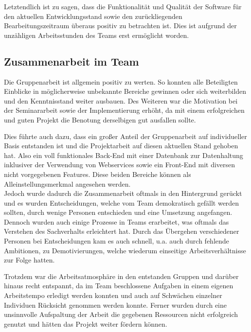 Letztendlich ist zu sagen, dass die Funktionalität und Qualität der Software für den aktuellen Entwicklungsstand sowie den zurückliegenden Bearbeitungszeitraum überaus positiv zu betrachten ist.
Dies ist aufgrund der unzähligen Arbeitsstunden des Teams erst ermöglicht worden.

\subsection{Zusammenarbeit im Team}
\multipleauthorsection{\authorRF}{\authorEJ}

Die Gruppenarbeit ist allgemein positiv zu werten. 
So konnten alle Beteiligten Einblicke in möglicherweise unbekannte Bereiche gewinnen oder sich weiterbilden und den Kenntnisstand weiter ausbauen.
Des Weiteren war die Motivation bei der Seminararbeit sowie der Implementierung erhöht, da mit einem erfolgreichen und guten Projekt die Benotung derselbigen gut ausfallen sollte.

Dies führte auch dazu, dass ein großer Anteil der Gruppenarbeit auf individueller Basis entstanden ist und die Projektarbeit auf diesen aktuellen Stand gehoben hat. Also ein voll funktionales Back-End mit einer Datenbank zur Datenhaltung inklusiver der Verwendung von Webservices sowie ein Front-End mit diversen nicht vorgegebenen Features. Diese beiden Bereiche können als Alleinstellungsmerkmal angesehen werden.\\
Jedoch wurde dadurch die Zusammenarbeit oftmals in den Hintergrund gerückt und es wurden Entscheidungen, welche vom Team demokratisch gefällt werden sollten, durch wenige Personen entschieden und eine Umsetzung angefangen. Dennoch wurden auch einige Prozesse in Teams erarbeitet, was oftmals das Verstehen des Sachverhalts erleichtert hat.
Durch das Übergehen verschiedener Personen bei Entscheidungen kam es auch schnell, u.a. auch durch fehlende Ambitionen, zu Demotivierungen, welche wiederum einseitige Arbeitsverhältnisse zur Folge hatten.

Trotzdem war die Arbeitsatmosphäre in den entstanden Gruppen und darüber hinaus recht entspannt, da im Team beschlossene Aufgaben in einem eigenen Arbeitstempo erledigt werden konnten und auch auf Schwächen einzelner Individuen Rücksicht genommen werden konnte.
Ferner wurden durch eine unsinnvolle Aufspaltung der Arbeit die gegebenen Ressourcen nicht erfolgreich genutzt und hätten das Projekt weiter fördern können.

